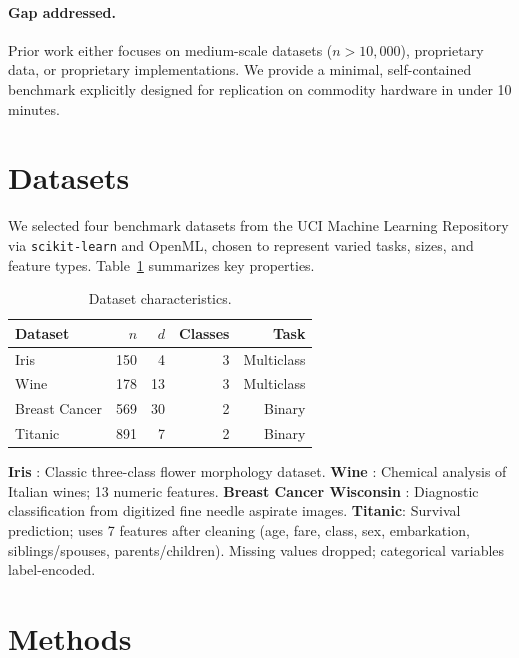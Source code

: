 \documentclass[10pt,twocolumn]{article}
\begin{document}
\paragraph{Gap addressed.}
Prior work either focuses on medium-scale datasets ($n > 10{,}000$), proprietary data, or 
proprietary implementations. We provide a minimal, self-contained benchmark explicitly 
designed for replication on commodity hardware in under 10 minutes.

\section{Datasets}

We selected four benchmark datasets from the UCI Machine Learning Repository via 
\texttt{scikit-learn} and OpenML, chosen to represent varied tasks, sizes, and feature types.
Table~\ref{tab:datasets} summarizes key properties.

\begin{table}[h]
\centering
\caption{Dataset characteristics.}
\label{tab:datasets}
\small
\begin{tabular}{lrrrr}
\toprule
\textbf{Dataset} & \textbf{$n$} & \textbf{$d$} & \textbf{Classes} & \textbf{Task} \\
\midrule
Iris          &  150 &  4 & 3 & Multiclass \\
Wine          &  178 & 13 & 3 & Multiclass \\
Breast Cancer &  569 & 30 & 2 & Binary \\
Titanic       &  891 &  7 & 2 & Binary \\
\bottomrule
\end{tabular}
\end{table}

\textbf{Iris} \citep{fisher1936iris}: Classic three-class flower morphology dataset.
\textbf{Wine} \citep{aeberhard1994wine}: Chemical analysis of Italian wines; 13 numeric features.
\textbf{Breast Cancer Wisconsin} \citep{mangasarian1995breast}: Diagnostic classification from digitized fine needle aspirate images.
\textbf{Titanic}: Survival prediction; uses 7 features after cleaning (age, fare, class, sex, embarkation, siblings/spouses, parents/children). Missing values dropped; categorical variables label-encoded.

\section{Methods}
\end{document}
